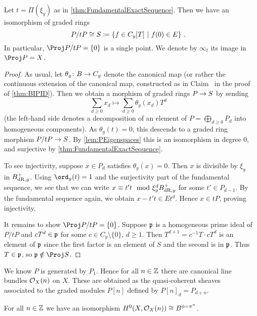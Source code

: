 \documentclass[a4paper, 10pt, oneside, DIV=9, chapterprefix=true, numbers=enddot,bibliography=totoc]{scrbook}
\begin{document}
\begin{cor}\label{cor:P/tPpoint}
	Let $t=\Pi(\xi_y)$ as in \cref{thm:FundamentalExactSequence}. Then we have an isomorphism of graded rings
	\begin{equation*}
		P/tP\cong S\coloneqq\left\{f\in C_y[T]\ \middle|\  f(0)\in E\right\}\,.
	\end{equation*}
	In particular, $\Proj P/tP=\{0\}$ is a single point. We denote by $\infty_t$ its image in $\Proj P=X$.
\end{cor}
\begin{proof}
	As usual, let $\theta_y\colon B\morphism C_y$ denote the canonical map (or rather the continuous extension of the canonical map, constructed as in Claim~ in the proof of \cref{thm:BIPID}). Then we obtain a morphism of graded rings $P\morphism S$ by sending
	\begin{equation*}
		\sum_{d\geq 0}x_d\longmapsto \sum_{d\geq 0}\theta_y(x_d)T^d
	\end{equation*}
	(the left-hand side denotes a decomposition of an element of $P=\bigoplus_{d\geq 0}P_d$ into homogeneous components). As $\theta_y(t)=0$, this descends to a graded ring morphism $P/tP\morphism S$. By \cref{lem:PEigenspaces} this is an isomorphism in degree $0$, and surjective by \cref{thm:FundamentalExactSequence}.
	
	To see injectivity, suppose $x\in P_d$ satisfies $\theta_y(x)=0$. Then $x$ is divisible by $\xi_y$ in $B_{\mathrm{dR},y}^+$. Using $\ord_y(t)=1$ and the surjectivity part of the fundamental sequence, we see that we can write $x\equiv t't\mod \xi_y^dB_{\mathrm{dR},y}^+$ for some $t'\in P_{d-1}$. By the fundamental sequence again, we obtain $x-t't\in Et^d$. Hence $x\in tP$, proving injectivity.
	
	It remains to show $\Proj P/tP=\{0\}$. Suppose $\mathfrak{p}$ is a homogeneous prime ideal of $P/tP$ and $cT^d\in \mathfrak{p}$ for some $c\in C_y\setminus\{0\}$, $d\geq 1$. Then $T^{d+1}=c^{-1}T\cdot cT^d$ is an element of $\mathfrak{p}$ since the first factor is an element of $S$ and the second is in $\mathfrak{p}$. Thus $T\in \mathfrak{p}$, so $\pp\notin \Proj S$.
\end{proof}
We know $P$ is generated by $P_1$. Hence for all $n\in \mathbb{Z}$ there are canonical line bundles $\mathcal{O}_X(n)$ on $X$. These are obtained as the quasi-coherent sheaves associated to the graded modules $P[n]$ defined by $P[n]_d=P_{d+n}$.
\begin{lem}\label{lem:HiOXn}
	For all $n\in \mathbb{Z}$ we have an isomorphism $H^0(X,\Oo_X(n))\cong B^{\phi=\pi^n}$.
\end{lem}
\end{document}
